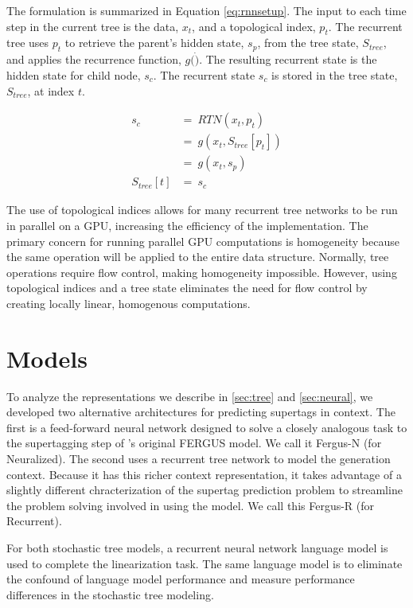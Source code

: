 \documentclass[11pt]{article}
\begin{document}
The formulation is summarized in Equation \ref{eq:rnnsetup}.
%
The input to each time step in the current tree is the data, $x_t$, and a topological
index, $p_t$.
%
The recurrent tree uses $p_t$ to retrieve the parent's hidden state, $s_p$, from the
tree state, $S_{tree}$, and applies the recurrence function, $g(\dot)$.
%
The resulting recurrent state is the hidden state for child node, $s_c$.
%
The recurrent state $s_c$ is stored in the tree state, $S_{tree}$, at index $t$.

\begin{align}
       s_c~&=~RTN(x_t,p_t) \nonumber \\
           &=~g(x_t,S_{tree}[p_t]) \nonumber \\
           &=~g(x_t, s_p) \nonumber \\
S_{tree}[t]&=~s_c \label{eq:rnnsetup}
\end{align}

The use of topological indices allows for many recurrent tree networks to be
run in parallel on a GPU, increasing the efficiency of the implementation.
%
The primary concern for running parallel GPU computations is homogeneity because
the same operation will be applied to the entire data structure.
%
Normally, tree operations require flow control, making homogeneity impossible.
%
However, using topological indices and a tree state eliminates the need for flow control
by creating locally linear, homogenous computations.

\section{Models}
\label{sec:models}

To analyze the representations we describe in \ref{sec:tree} and
\ref{sec:neural}, we developed two alternative architectures for
predicting supertags in context.
%
The first is a feed-forward neural network designed to solve a closely
analogous task to the supertagging step of
's original FERGUS model.
%
We call it Fergus-N (for Neuralized).
%
The second uses a recurrent tree network to model the generation
context.
%
Because it has this richer context representation, it takes advantage
of a slightly different chracterization of the supertag prediction
problem to streamline the problem solving involved in using the model.
%
We call this Fergus-R (for Recurrent).

For both stochastic tree models, a recurrent neural network language model is used to complete the linearization task.
%
%
The same language model is to eliminate the confound of
language model performance and measure performance differences in the
stochastic tree modeling.
%
\end{document}

